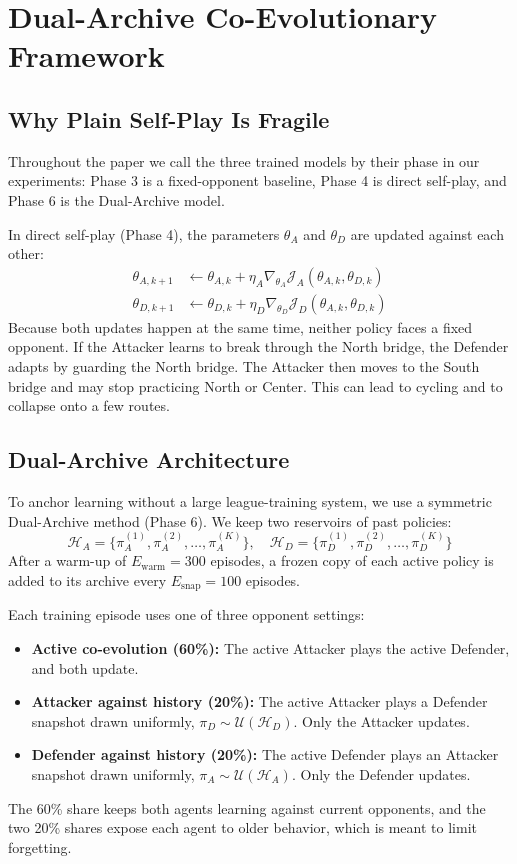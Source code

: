 \documentclass[conference]{IEEEtran}
\begin{document}
\section{Dual-Archive Co-Evolutionary Framework}

\subsection{Why Plain Self-Play Is Fragile}
Throughout the paper we call the three trained models by their phase in our experiments: Phase 3 is a fixed-opponent baseline, Phase 4 is direct self-play, and Phase 6 is the Dual-Archive model.

In direct self-play (Phase 4), the parameters $\theta_A$ and $\theta_D$ are updated against each other:
\begin{align}
\theta_{A, k+1} &\leftarrow \theta_{A, k} + \eta_A \nabla_{\theta_A} \mathcal{J}_A(\theta_{A, k}, \theta_{D, k}) \\
\theta_{D, k+1} &\leftarrow \theta_{D, k} + \eta_D \nabla_{\theta_D} \mathcal{J}_D(\theta_{A, k}, \theta_{D, k})
\end{align}
Because both updates happen at the same time, neither policy faces a fixed opponent. If the Attacker learns to break through the North bridge, the Defender adapts by guarding the North bridge. The Attacker then moves to the South bridge and may stop practicing North or Center. This can lead to cycling and to collapse onto a few routes.

\subsection{Dual-Archive Architecture}
To anchor learning without a large league-training system, we use a symmetric Dual-Archive method (Phase 6). We keep two reservoirs of past policies:
\begin{equation}
\mathcal{H}_A = \{\pi_A^{(1)}, \pi_A^{(2)}, \dots, \pi_A^{(K)}\}, \quad \mathcal{H}_D = \{\pi_D^{(1)}, \pi_D^{(2)}, \dots, \pi_D^{(K)}\}
\end{equation}
After a warm-up of $E_{\text{warm}} = 300$ episodes, a frozen copy of each active policy is added to its archive every $E_{\text{snap}} = 100$ episodes.

Each training episode uses one of three opponent settings:
\begin{itemize}
    \item \textbf{Active co-evolution (60\%):} The active Attacker plays the active Defender, and both update.
    \item \textbf{Attacker against history (20\%):} The active Attacker plays a Defender snapshot drawn uniformly, $\pi_D \sim \mathcal{U}(\mathcal{H}_D)$. Only the Attacker updates.
    \item \textbf{Defender against history (20\%):} The active Defender plays an Attacker snapshot drawn uniformly, $\pi_A \sim \mathcal{U}(\mathcal{H}_A)$. Only the Defender updates.
\end{itemize}
The 60\% share keeps both agents learning against current opponents, and the two 20\% shares expose each agent to older behavior, which is meant to limit forgetting.
\end{document}
